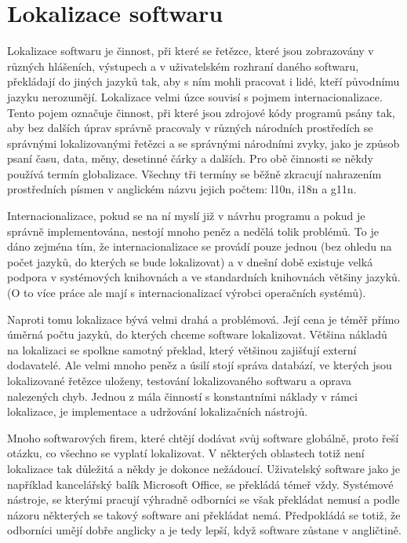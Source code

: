 \documentclass[12pt,a4paper]{report}
\begin{document}
\section*{Lokalizace softwaru}

Lokalizace softwaru je činnost, při které se řetězce, které jsou zobrazovány v
různých hlášeních, výstupech a v uživatelském rozhraní daného softwaru,
překládají do jiných jazyků tak, aby s ním mohli pracovat i lidé, kteří
původnímu jazyku nerozumějí. Lokalizace velmi úzce souvisí s pojmem
internacionalizace.  Tento pojem označuje činnost, při které jsou  zdrojové
kódy programů psány tak, aby bez dalších úprav správně pracovaly v různých
národních prostředích se správnými lokalizovanými řetězci a se správnými
národními zvyky, jako je způsob psaní času, data, měny, desetinné čárky a
dalších. Pro obě činnosti se někdy používá termín globalizace. Všechny tři
termíny se běžně zkracují nahrazením prostředních písmen v anglickém názvu
jejich počtem: l10n, i18n a g11n.

Internacionalizace, pokud se na ní myslí již v návrhu programu a pokud je
správně implementována, nestojí mnoho peněz a nedělá tolik problémů. To je dáno
zejména tím, že internacionalizace se provádí pouze jednou (bez ohledu na počet
jazyků, do kterých se bude lokalizovat) a v dnešní době existuje velká podpora
v systémových knihovnách a ve standardních knihovnách většiny jazyků. (O to více práce ale mají
s internacionalizací výrobci operačních systémů).

Naproti tomu lokalizace bývá velmi drahá a problémová. Její cena je téměř přímo
úměrná počtu jazyků, do kterých chceme software lokalizovat. Většina nákladů na
lokalizaci se spolkne samotný překlad, který většinou zajišťují externí
dodavatelé.  Ale velmi mnoho peněz a úsilí stojí správa databází, ve kterých
jsou lokalizované řetězce uloženy, testování lokalizovaného softwaru a oprava
nalezených chyb. Jednou z mála činností s konstantními náklady v rámci
lokalizace, je implementace a udržování lokalizačních nástrojů. 

Mnoho softwarových firem, které chtějí dodávat svůj software globálně, proto
řeší otázku, co všechno se vyplatí lokalizovat. V některých oblastech totiž
není lokalizace tak důležitá a někdy je dokonce nežádoucí. Uživatelský software
jako je například kancelářský balík Microsoft Office, se překládá témeř vždy. Systémové
nástroje, se kterými pracují výhradně odborníci se však překládat nemusí a podle názoru některých se takový 
software ani překládat nemá. Předpokládá se totiž, že odborníci umějí dobře anglicky a je tedy lepší, 
když software zůstane v angličtině.
\end{document}
